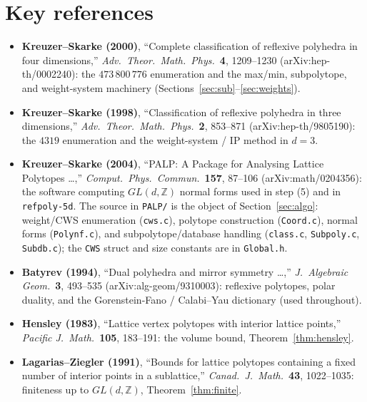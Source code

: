 \documentclass{amsart}
\begin{document}
\section{Key references}
\begin{itemize}
  \item \textbf{Kreuzer--Skarke (2000)}, ``Complete classification of
        reflexive polyhedra in four dimensions,'' \emph{Adv.\ Theor.\ Math.\
        Phys.}\ \textbf{4}, 1209--1230 (arXiv:hep-th/0002240): the
        $473\,800\,776$ enumeration and the max/min, subpolytope, and
        weight-system machinery (Sections~\ref{sec:sub}--\ref{sec:weights}).
  \item \textbf{Kreuzer--Skarke (1998)}, ``Classification of reflexive
        polyhedra in three dimensions,'' \emph{Adv.\ Theor.\ Math.\ Phys.}\
        \textbf{2}, 853--871 (arXiv:hep-th/9805190): the $4319$ enumeration
        and the weight-system / IP method in $d=3$.
  \item \textbf{Kreuzer--Skarke (2004)}, ``PALP: A Package for Analysing
        Lattice Polytopes \dots,'' \emph{Comput.\ Phys.\ Commun.}\
        \textbf{157}, 87--106 (arXiv:math/0204356): the software computing
        $GL(d,\mathbb{Z})$ normal forms used in step (5) and in
        \texttt{refpoly-5d}. The source in \texttt{PALP/} is the object of
        Section~\ref{sec:algo}: weight/CWS enumeration (\texttt{cws.c}),
        polytope construction (\texttt{Coord.c}), normal forms
        (\texttt{Polynf.c}), and subpolytope/database handling
        (\texttt{class.c}, \texttt{Subpoly.c}, \texttt{Subdb.c}); the
        \texttt{CWS} struct and size constants are in \texttt{Global.h}.
  \item \textbf{Batyrev (1994)}, ``Dual polyhedra and mirror symmetry
        \dots,'' \emph{J.\ Algebraic Geom.}\ \textbf{3}, 493--535
        (arXiv:alg-geom/9310003): reflexive polytopes, polar duality, and
        the Gorenstein-Fano / Calabi--Yau dictionary (used throughout).
  \item \textbf{Hensley (1983)}, ``Lattice vertex polytopes with interior
        lattice points,'' \emph{Pacific J.\ Math.}\ \textbf{105}, 183--191:
        the volume bound, Theorem~\ref{thm:hensley}.
  \item \textbf{Lagarias--Ziegler (1991)}, ``Bounds for lattice polytopes
        containing a fixed number of interior points in a sublattice,''
        \emph{Canad.\ J.\ Math.}\ \textbf{43}, 1022--1035: finiteness up to
        $GL(d,\mathbb{Z})$, Theorem~\ref{thm:finite}.

\end{itemize}
\end{document}
